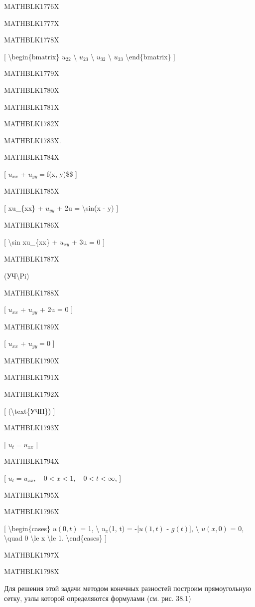 \documentclass[
]{article}
\begin{document}
{{{MATHBLK1776X

MATHBLK1777X

MATHBLK1778X

{[} \textbackslash begin\{bmatrix\} \(u_{22}\) \textbackslash{}
\(u_{23}\) \textbackslash{} \(u_{32}\) \textbackslash{} \(u_{33}\)
\textbackslash end\{bmatrix\} {]}

MATHBLK1779X

MATHBLK1780X

MATHBLK1781X

MATHBLK1782X

MATHBLK1783X.

MATHBLK1784X

{[} \(u_{xx}\) + \(u_{yy} =\)f(x, y)\$\$ {]}

MATHBLK1785X

{[} xu\_\{xx\} + \(u_{yy}\) + 2u = \textbackslash sin(x - y) {]}

MATHBLK1786X

{[} \textbackslash sin xu\_\{xx\} + \(u_{xy}\) + 3u = 0 {]}

MATHBLK1787X

(УЧ\textbackslash Pi)

MATHBLK1788X

{[} \(u_{xx}\) + \(u_{yy}\) + 2u = 0 {]}

MATHBLK1789X

{[} \(u_{xx}\) + \(u_{yy} = 0\) {]}

MATHBLK1790X

MATHBLK1791X

MATHBLK1792X

{[} (\textbackslash text\{УЧП\}) {]}

MATHBLK1793X

{[} \(u_t = u_{xx}\) {]}

MATHBLK1794X

{[} \(u_t = u_{xx}, \quad 0 < x < 1, \quad 0 < t < \infty\), {]}

MATHBLK1795X

MATHBLK1796X

{[} \textbackslash begin\{cases\} \(u(0, t)\) = 1, \textbackslash{}
\(u_x\)(1, t) = -{[}\(u(1, t)\) - \(g(t)\){]}, \textbackslash{}
\(u(x, 0)\) = 0, \textbackslash quad 0 \textbackslash le x
\textbackslash le 1. \textbackslash end\{cases\} {]}

MATHBLK1797X

MATHBLK1798X

Для решения этой задачи методом конечных разностей построим
прямоугольную сетку, узлы которой определяются формулами (см. рис. 38.1)

}}}
\end{document}
